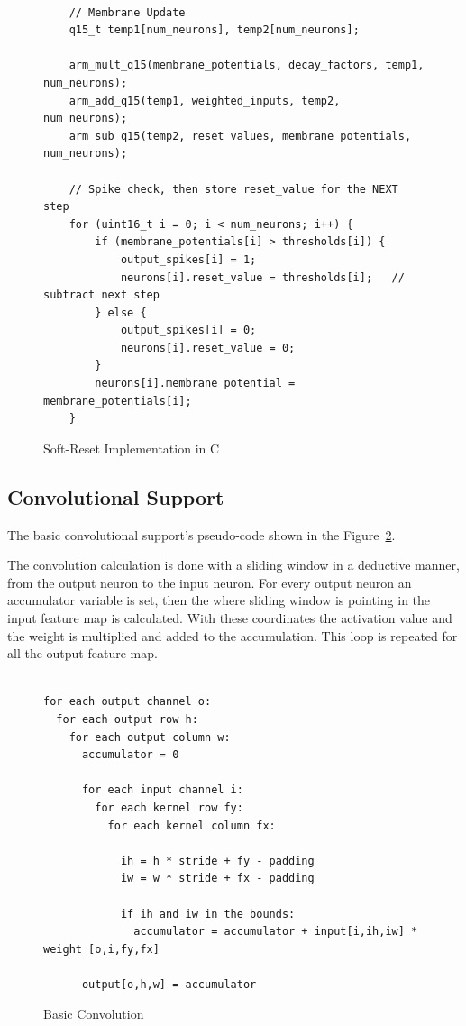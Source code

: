 \documentclass[11pt,a4paper]{article}
\begin{document}
\begin{figure}[h]
\centering
\begin{lstlisting}

    // Membrane Update
    q15_t temp1[num_neurons], temp2[num_neurons];

    arm_mult_q15(membrane_potentials, decay_factors, temp1, num_neurons);
    arm_add_q15(temp1, weighted_inputs, temp2, num_neurons);
    arm_sub_q15(temp2, reset_values, membrane_potentials, num_neurons);

    // Spike check, then store reset_value for the NEXT step
    for (uint16_t i = 0; i < num_neurons; i++) {
        if (membrane_potentials[i] > thresholds[i]) {
            output_spikes[i] = 1;
            neurons[i].reset_value = thresholds[i];   // subtract next step
        } else {
            output_spikes[i] = 0;
            neurons[i].reset_value = 0;
        }
        neurons[i].membrane_potential = membrane_potentials[i];
    }

\end{lstlisting}
\caption{Soft-Reset Implementation in C}
\label{fig:soft-reset-c}
\end{figure}





\subsection{Convolutional Support}

The basic convolutional support's pseudo-code shown in the Figure~\ref{fig:basic_conv}.

The convolution calculation is done with a sliding window in a deductive manner, from the output neuron to the input neuron.
For every output neuron an accumulator variable is set, 
then the where sliding window is pointing in the input feature map is calculated. 
With these coordinates the activation value and the weight is multiplied and added to the accumulation.
This loop is repeated for all the output feature map. 

\begin{figure}[h]
\centering
\begin{lstlisting}

for each output channel o:
  for each output row h:
    for each output column w:
      accumulator = 0

      for each input channel i:
        for each kernel row fy:
          for each kernel column fx:
            
            ih = h * stride + fy - padding 
            iw = w * stride + fx - padding

            if ih and iw in the bounds:
              accumulator = accumulator + input[i,ih,iw] * weight [o,i,fy,fx]

      output[o,h,w] = accumulator

\end{lstlisting}
\caption{Basic Convolution}
\label{fig:basic_conv}
\end{figure}
\end{document}
